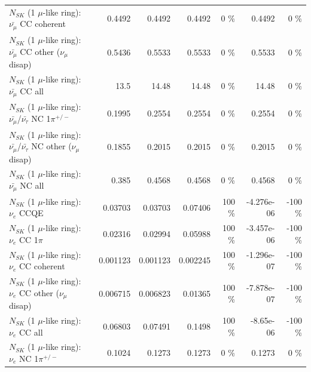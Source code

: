 \begin{table}
\begin{tabular}{| l | r | r | r  r | r  r |}
                       $N_{SK}$ (1 $\mu$-like ring): $\bar{\nu_\mu}$ CC coherent &          0.4492 &          0.4492 &          0.4492 &        0 \%  &          0.4492 &        0 \%  \\ 
        $N_{SK}$ (1 $\mu$-like ring): $\bar{\nu_\mu}$ CC other ($\nu_\mu$ disap) &          0.5436 &          0.5533 &          0.5533 &        0 \%  &          0.5533 &        0 \%  \\ 
                          $N_{SK}$ (1 $\mu$-like ring): $\bar{\nu_{\mu}}$ CC all &            13.5 &           14.48 &           14.48 &        0 \%  &           14.48 &        0 \%  \\ 
\hline
  $N_{SK}$ (1 $\mu$-like ring): $\bar{\nu_\mu}$/$\bar{\nu_\tau}$ NC 1$\pi^{+/-}$ &          0.1995 &          0.2554 &          0.2554 &        0 \%  &          0.2554 &        0 \%  \\ 
$N_{SK}$ (1 $\mu$-like ring): $\bar{\nu_\mu}$/$\bar{\nu_\tau}$ NC other ($\nu_\mu$ disap) &          0.1855 &          0.2015 &          0.2015 &        0 \%  &          0.2015 &        0 \%  \\ 
                          $N_{SK}$ (1 $\mu$-like ring): $\bar{\nu_{\mu}}$ NC all &           0.385 &          0.4568 &          0.4568 &        0 \%  &          0.4568 &        0 \%  \\ 
\hline
\hline
\hline
                                      $N_{SK}$ (1 $\mu$-like ring): $\nu_e$ CCQE &         0.03703 &         0.03703 &         0.07406 &      100 \%  &      -4.276e-06 &     -100 \%  \\ 
                                 $N_{SK}$ (1 $\mu$-like ring): $\nu_e$ CC 1$\pi$ &         0.02316 &         0.02994 &         0.05988 &      100 \%  &      -3.457e-06 &     -100 \%  \\ 
                               $N_{SK}$ (1 $\mu$-like ring): $\nu_e$ CC coherent &        0.001123 &        0.001123 &        0.002245 &      100 \%  &      -1.296e-07 &     -100 \%  \\ 
                $N_{SK}$ (1 $\mu$-like ring): $\nu_e$ CC other ($\nu_\mu$ disap) &        0.006715 &        0.006823 &         0.01365 &      100 \%  &      -7.878e-07 &     -100 \%  \\ 
                                  $N_{SK}$ (1 $\mu$-like ring): $\nu_{e}$ CC all &         0.06803 &         0.07491 &          0.1498 &      100 \%  &       -8.65e-06 &     -100 \%  \\ 
\hline
                           $N_{SK}$ (1 $\mu$-like ring): $\nu_e$ NC 1$\pi^{+/-}$ &          0.1024 &          0.1273 &          0.1273 &        0 \%  &          0.1273 &        0 \%  \\ 

\end{tabular}
\end{table}
